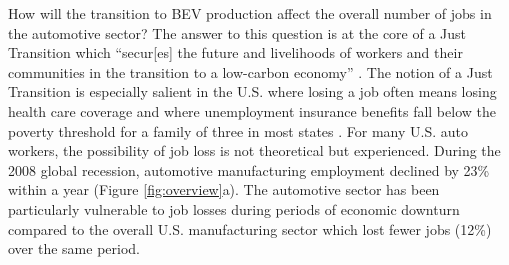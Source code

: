 \documentclass[sn-mathphys,Numbered]{sn-jnl}%
\begin{document}
How will the transition to BEV production affect the overall number of jobs in the automotive sector? The answer to this question is at the core of a Just Transition which ``secur[es] the future and livelihoods of workers and their communities in the transition to a low-carbon economy'' \cite{Emden2022-wa, Romero-Lankao2023-ws, Just_Transition_Initiative2021-mq, Lim2023-dp}. The notion of a Just Transition is especially salient in the U.S. where losing a job often means losing health care coverage \cite{Himmelstein2019-bm} and where unemployment insurance benefits fall below the poverty threshold for a family of three in most states \cite{DeSilver2020-oy, US_Department_of_Health_and_Human_Services_undated-my, Tasini2021-jk}. For many U.S. auto workers, the possibility of job loss is not theoretical but experienced. During the 2008 global recession, automotive manufacturing employment declined by 23\% within a year (Figure \ref{fig:overview}a). The automotive sector has been particularly vulnerable to job losses during periods of economic downturn compared to the overall U.S. manufacturing sector which lost fewer jobs (12\%) over the same period.
\end{document}
